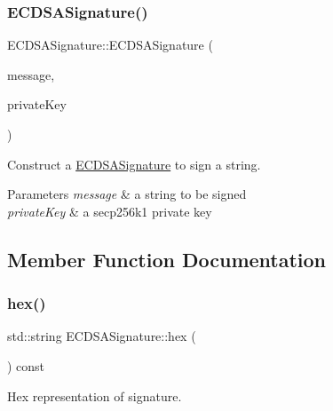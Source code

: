 \subsubsection{\texorpdfstring{E\+C\+D\+S\+A\+Signature()}{ECDSASignature()}\hspace{0.1cm}{\footnotesize\ttfamily [2/2]}}
{\footnotesize\ttfamily E\+C\+D\+S\+A\+Signature\+::\+E\+C\+D\+S\+A\+Signature (\begin{DoxyParamCaption}\item[{std\+::string}]{message,  }\item[{e\+Curve\+::\+Private\+Key}]{private\+Key }\end{DoxyParamCaption})}



Construct a \mbox{\hyperlink{classECDSASignature}{E\+C\+D\+S\+A\+Signature}} to sign a string. 


\begin{DoxyParams}{Parameters}
{\em message} & a string to be signed \\
\hline
{\em private\+Key} & a secp256k1 private key \\
\hline
\end{DoxyParams}


\subsection{Member Function Documentation}
\mbox{\label{classECDSASignature_a9179c6cec311dbb746ffe876dce12844}} 
\subsubsection{\texorpdfstring{hex()}{hex()}}
{\footnotesize\ttfamily std\+::string E\+C\+D\+S\+A\+Signature\+::hex (\begin{DoxyParamCaption}{ }\end{DoxyParamCaption}) const}



Hex representation of signature. 

\mbox{\label{classECDSASignature_aae4f75f7c0b41adddee0123392d8d960}} 
